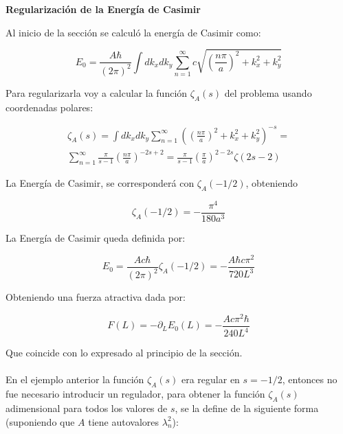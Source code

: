 \textbf{Regularización de la Energía de Casimir}

Al inicio de la sección se calculó la energía de Casimir como:

\begin{equation}
E _0 = \frac{A \hbar }{(2 \pi) ^2} \int dk _x dk _y 
\sum _{n=1} ^{\infty} 
c
\sqrt{
		\left( \frac{n \pi}{a } \right) ^2 + k _x ^2 + k _y ^2
		}
\end{equation}

Para regularizarla voy a calcular la función $\zeta _A (s)$ del problema usando coordenadas polares:

\begin{equation}
\begin{array}{c}

\zeta _A (s) = 
\int dk _x dk _y 
\sum _{n=1} ^{\infty} 
\left(	\left( \frac{n \pi}{a } \right) ^2 + k _x ^2 + k _y ^2
		\right) ^{-s} = \\
\sum _{n=1} ^{\infty}  \frac{\pi}{s-1} \left( \frac{n \pi}{a} \right) ^{-2s+2} =
\frac{\pi}{s-1} \left( \frac{\pi}{a} \right) ^{2-2s} \zeta (2s-2) 

\end{array}
\end{equation}

La Energía de Casimir, se corresponderá con $\zeta _A (-1/2)$, obteniendo 


\begin{equation}
\zeta _A (-1/2) = 
- \frac{\pi ^4}{180 a ^3}
\end{equation}

La Energía de Casimir queda definida por:

\begin{equation}
E _0 =  \frac{A c \hbar}{(2 \pi) ^2}
\zeta _A (-1/2) =
- \frac{A \hbar c \pi ^2}
		{720 L ^3}
\end{equation}

Obteniendo una fuerza atractiva dada por:

\begin{equation}
F(L) = - \partial _L E _0 (L) = 
- \frac{A c \pi ^2 \hbar}{240 L^4}
\end{equation}

Que coincide con lo expresado al principio de la sección. \\ \\


En el ejemplo anterior la función $\zeta _A (s) $ era regular en $s= -1/2$, entonces no fue necesario introducir un regulador, para obtener la función $\zeta _A (s)$ adimensional para todos los valores de $s$, se la define de la siguiente forma (suponiendo que $A$ tiene autovalores $\lambda _n ^2 $):

